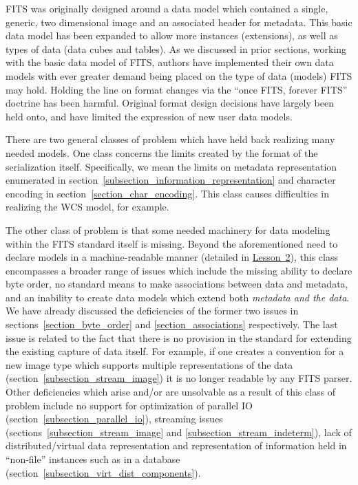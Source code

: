 \documentclass[final,authoryear,5p,times,twocolumn]{elsarticle}
\begin{document}
{{FITS was originally designed around a data model which contained a single, generic,
two dimensional image and an associated header for metadata. This basic data model
has been expanded to allow more instances (extensions), as well as types of data
(data cubes and tables).
As we discussed in prior sections, working with the basic data model of FITS,
authors have implemented their own data models with ever greater demand being
placed on the type of data (models) FITS may hold.
Holding the line on format changes via the ``once FITS, forever FITS'' doctrine
has been harmful.  Original format design decisions have largely been held onto,
and have limited the expression of new user data models.


There are two general classes of problem which have held back realizing
many needed models. One class concerns the limits created by the format
of the serialization itself. Specifically, we mean the limits on metadata
representation enumerated in section~\ref{subsection_information_representation}
and character encoding in section~\ref{section_char_encoding}.
This class causes difficulties in realizing the WCS model, for example.


The other class of problem is that some needed machinery for data modeling
within the FITS standard itself is missing. Beyond the aforementioned need to
declare models in a machine-readable manner (detailed in
\hyperref[section_lesson_2]{Lesson~2}), this class encompasses a broader range
of issues which include the missing ability to declare byte order,
no standard means to make associations between data and metadata, and
an inability to create data models which extend both
\textit{metadata and the data}. We have already discussed the deficiencies of
the former two issues in sections~\ref{section_byte_order} and
\ref{section_associations} respectively.  The last issue is related to the fact
that there is no provision in the standard for extending the existing capture
of data itself. For example, if one creates a convention for a new image type
which supports multiple representations of the data (section~\ref{subsection_stream_image})
it is no longer readable by any FITS parser. Other deficiencies which arise and/or are
unsolvable as a result of this class of problem include no support for 
optimization of parallel IO (section~\ref{subsection_parallel_io}), streaming issues
(sections~\ref{subsection_stream_image} and \ref{subsection_stream_indeterm}),
lack of distributed/virtual data representation
and representation of information held in ``non-file'' instances such as in a
database (section~\ref{subsection_virt_dist_components}).


}}
\end{document}
